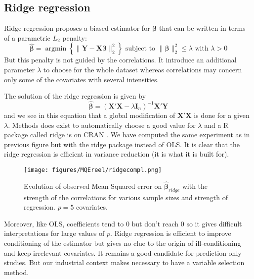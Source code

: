 \documentclass[12pt,a4paper]{report}
\begin{document}
		\subsection{Ridge regression}		%

Ridge regression \cite{hoerl1970ridge,marquardt1975ridge} proposes a biased estimator for $\boldsymbol{\beta}$ that can be written in terms of a parametric $L_2$ penalty:
	\begin{equation}
		 \boldsymbol{\hat{\beta}}=\operatorname{argmin} \left\lbrace \parallel \boldsymbol{Y}-\boldsymbol{X\beta}\parallel_2^2 \right\rbrace \textrm{ subject to } \parallel \boldsymbol{\beta} \parallel_2^2\leq \lambda \textrm{ with } \lambda>0
	\end{equation}
	But this penalty is not guided by the correlations. It introduce an additional parameter $\lambda$ to choose for the whole dataset  whereas correlations may concern only some of the covariates with several intensities.
	
	The solution of the ridge regression is given by
	\begin{equation}
		 \hat{\boldsymbol{\beta}}=\left(\boldsymbol{X}'\boldsymbol{X} -\lambda\boldsymbol{I}_n\right) ^{-1}\boldsymbol{X}'\boldsymbol{Y}\label{betaridge}
	\end{equation}
	and we see in this equation that a global modification of $\boldsymbol{X}'\boldsymbol{X}$ is done for a given $\lambda$. Methods does exist to automatically choose a good value for $\lambda$ \cite{cule2013ridge,er2013systematic} and a R package called ridge is on CRAN \cite{packageridge}. 
	We have computed the same experiment as in previous figure but with the ridge package instead of OLS. It is clear that the ridge regression is efficient in variance reduction (it is what it is built for).
	 \begin{figure}
	 \centering
	  \texttt{[image: figures/MQEreel/ridgecompl.png]}
	  \caption{Evolution of observed Mean Squared error on $\hat{\boldsymbol{\beta}}_{ridge}$ with the strength of the correlations for various sample sizes and strength of regression. $p=5$ covariates. } \label{MQEridgecompl}
	\end{figure}
	
	
	Moreover, like OLS, coefficients tend to 0 but don't reach 0 so it gives difficult interpretations for large values of $p$. Ridge regression is efficient to improve conditioning of the estimator but gives no clue to the origin of ill-conditioning and keep irrelevant covariates. It remains a good candidate for prediction-only studies. But our industrial context makes necessary to have a variable selection method.
	
\end{document}
